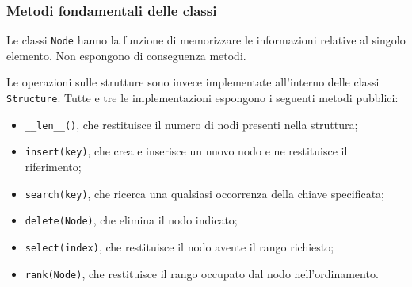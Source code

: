\documentclass[a4paper,11pt]{article}
\begin{document}
\subsubsection{Metodi fondamentali delle classi}
Le classi \texttt{Node} hanno la funzione di memorizzare le informazioni relative al singolo elemento. Non espongono di conseguenza metodi. 

Le operazioni sulle strutture sono invece implementate all'interno delle classi \texttt{Structure}. Tutte e tre le implementazioni espongono i seguenti metodi pubblici: 
\begin{itemize}
    \item \texttt{\_\_len\_\_()}, che restituisce il numero di nodi presenti nella struttura;
    
    \item \texttt{insert(key)}, che crea e inserisce un nuovo nodo e ne restituisce il riferimento;
    
    \item \texttt{search(key)}, che ricerca una qualsiasi occorrenza della chiave specificata;
    
    \item \texttt{delete(Node)}, che elimina il nodo indicato;
    
    \item \texttt{select(index)}, che restituisce il nodo avente il rango richiesto;
    
    \item \texttt{rank(Node)}, che restituisce il rango occupato dal nodo nell'ordinamento.
\end{itemize}
\end{document}
